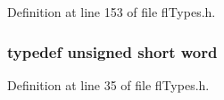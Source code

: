 Definition at line 153 of file fl\-Types.h.
\subsubsection{\setlength{\rightskip}{0pt plus 5cm}typedef unsigned short {\bf word}}\label{flTypes_8h_285e72252c100e2508e4e933a0738f2b}




Definition at line 35 of file fl\-Types.h.